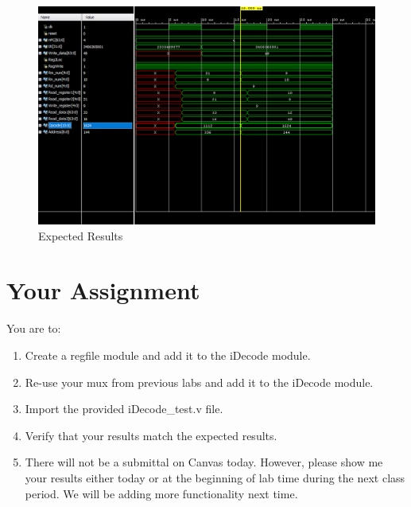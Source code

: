 
\begin{figure}
	\caption{Expected Results}\label{fig:register_file_test_output}
	\begin{center}
		\includegraphics[width=6.75in]{../images/register_file_test_output.png}
	\end{center}
\end{figure}

\clearpage
\section{Your Assignment}

You are to:
\begin{enumerate}
\item Create a regfile module and add it to the iDecode module.
\item Re-use your mux from previous labs and add it to the iDecode module.
\item Import the provided iDecode\_test.v file.
\item Verify that your results match the expected results.
\item There will not be a submittal on Canvas today.  However, please show me your results either today or at the beginning of lab time during the next class period.  We will be adding more functionality next time.
\end{enumerate} 